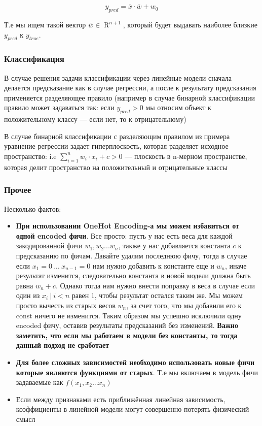 \documentclass{article}
\begin{document}
    \begin{equation}
        y_{pred} = \bar{x} \cdot \bar{w} + w_{0}
    \end{equation}

    Т.е мы ищем такой вектор $\bar{w} \in \operatorname{R}^{n + 1}$, который будет выдавать наиболее близкие $y_{pred}$ к $y_{true}$.

    \subsubsection{Классификация}

    В случае решения задачи классификации через линейные модели сначала делается предсказание как в случае регрессии, а после
    к результату предсказания применяется разделяющее правило (например в случае бинарной классификации правило может задаваться так:
    если $y_{pred} > 0$ мы относим объект к положительному классу --- если нет, то к отрицательному)

    В случае бинарной классификации с разделяющим правилом из примера уравнение регрессии задает гиперплоскость,
    которая разделяет исходное пространство: i.e $\sum_{i = 1}^{n}{w_{i} \cdot x_{i}} + c > 0$ --- плоскость в n-мерном пространстве,
    которая делит пространство на положительный и отрицательные классы

    \subsubsection{Прочее}

    Несколько фактов:

    \begin{itemize}
        \item \textbf{При использовании OneHot Encoding-а мы можем избавиться от одной encoded фичи}.
        Все просто: пусть у нас есть веса для каждой закодированной фичи $w_{1}, w_{2} ... w_{n}$, также у нас добавляется константа $c$
        к предсказанию по фичам.
        Давайте удалим последнюю фичу, тогда в случае если $x_{1} = 0 \ ... \ x_{n-1} = 0$ нам нужно добавить к константе еще и $w_{n}$, иначе результат изменится, следовательно
        константа в новой модели должна быть равна $w_{n} + c$. 
        Однако тогда нам нужно внести поправку в веса в случае если один из $x_{i} \ | \ i < n$ равен 1, чтобы
        результат остался таким же. 
        Мы можем просто вычесть из старых весов $w_{n}$, за счет того, что мы добавили его к const ничего не изменится.
        Таким образом мы успешно исключили одну encoded фичу, оставив результаты предсказаний без изменений. 
        \textbf{Важно заметить, что если мы работаем в модели без константы, то тогда данный подход не сработает}
        \item \textbf{Для более сложных зависимостей необходимо использовать новые фичи которые являются функциями от старых}.
        Т.е мы включаем в модель фичи задаваемые как $f(x_{1}, x_{2} ... x_{n})$
        \item Если между признаками есть приближённая линейная зависимость, коэффициенты в линейной модели могут совершенно потерять физический смысл
  
    \end{itemize}
    
\end{document}

